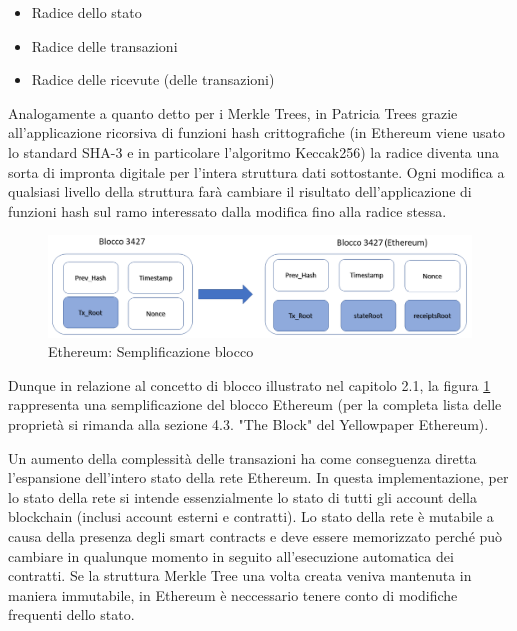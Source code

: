 \begin{itemize}
\item Radice dello stato
\item Radice delle transazioni
\item Radice delle ricevute (delle transazioni)
\end{itemize}

Analogamente a quanto detto per i Merkle Trees, in Patricia Trees grazie all'applicazione ricorsiva di funzioni hash crittografiche (in Ethereum viene usato lo standard SHA-3 e in particolare l'algoritmo Keccak256) la radice diventa una sorta di impronta digitale per l'intera struttura dati sottostante. Ogni modifica a qualsiasi livello della struttura farà cambiare il risultato dell'applicazione di funzioni hash sul ramo interessato dalla modifica fino alla radice stessa. 

\begin{figure}[H]
\centering
\includegraphics[width=1\textwidth]{immagini/EthBlockSimplified.png}
\caption{Ethereum: Semplificazione blocco}
\label{fig:BloccoEthereumSemplif}
\end{figure}

Dunque in relazione al concetto di blocco illustrato nel capitolo 2.1, la figura \ref{fig:BloccoEthereumSemplif} rappresenta una semplificazione del blocco Ethereum (per la completa lista delle proprietà si rimanda alla sezione 4.3. "The Block" del Yellowpaper Ethereum).

Un aumento della complessità delle transazioni ha come conseguenza diretta l’espansione dell’intero stato della rete Ethereum. In questa implementazione, per lo stato della rete si intende essenzialmente lo stato di tutti gli account della blockchain (inclusi account esterni e contratti). Lo stato della rete è mutabile a causa della presenza degli smart contracts e deve essere memorizzato perché può cambiare in qualunque momento in seguito all’esecuzione automatica dei contratti. Se la struttura Merkle Tree una volta creata veniva mantenuta in maniera immutabile, in Ethereum è neccessario tenere conto di modifiche frequenti dello stato.

